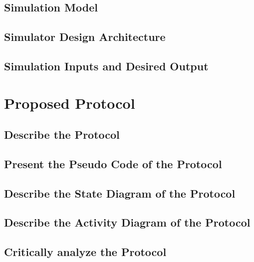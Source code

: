 \documentclass[10pt]{llncs}
\begin{document}
%
\subsection{Simulation Model}


%
\subsection{Simulator Design Architecture}


%
\subsection{Simulation Inputs and Desired Output}


%
\section{Proposed Protocol}

%
\subsection{Describe the Protocol}

%
\subsection{Present the Pseudo Code of the Protocol}

%
\subsection{Describe the State Diagram of the Protocol}

%
\subsection{Describe the Activity Diagram of the Protocol}


%
\subsection{Critically analyze the Protocol}
\end{document}
